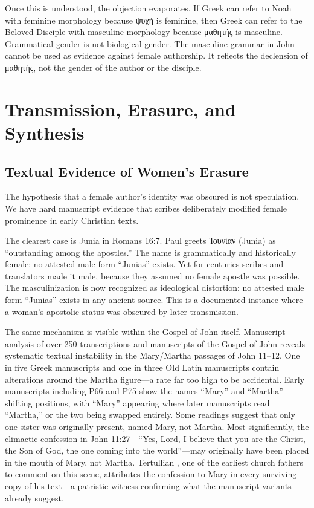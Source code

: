Once this is understood, the objection evaporates.
If Greek can refer to Noah with feminine morphology because ψυχή is feminine, then Greek can refer to the Beloved Disciple with masculine morphology because μαθητής is masculine.
Grammatical gender is not biological gender.
The masculine grammar in John cannot be used as evidence against female authorship.
It reflects the declension of μαθητής, not the gender of the author or the disciple.

\section{Transmission, Erasure, and Synthesis}\label{sec:transmission-erasure-synthesis}

\subsection{Textual Evidence of Women's Erasure}\label{subsec:textual-evidence-of-womens-erasure}

The hypothesis that a female author's identity was obscured is not speculation.
We have hard manuscript evidence that scribes deliberately modified female prominence in early Christian texts.

The clearest case is Junia in Romans 16:7.
Paul greets Ἰουνίαν (Junia) as ``outstanding among the apostles.''
The name is grammatically and historically female; no attested male form ``Junias'' exists.
Yet for centuries scribes and translators made it male, because they assumed no female apostle was possible.
The masculinization is now recognized as ideological distortion: no attested male form ``Junias'' exists in any ancient source.
This is a documented instance where a woman's apostolic status was obscured by later transmission.

The same mechanism is visible within the Gospel of John itself.
Manuscript analysis \cite{schrader:martha} of over 250 transcriptions and manuscripts of the Gospel of John reveals systematic textual instability in the Mary/Martha passages of John 11--12.
One in five Greek manuscripts and one in three Old Latin manuscripts contain alterations around the Martha figure---a rate far too high to be accidental.
Early manuscripts including P66 and P75 show the names ``Mary'' and ``Martha'' shifting positions, with ``Mary'' appearing where later manuscripts read ``Martha,'' or the two being swapped entirely.
Some readings suggest that only one sister was originally present, named Mary, not Martha.
Most significantly, the climactic confession in John 11:27---``Yes, Lord, I believe that you are the Christ, the Son of God, the one coming into the world''---may originally have been placed in the mouth of Mary, not Martha.
Tertullian \cite{tertullian:praxean}, one of the earliest church fathers to comment on this scene, attributes the confession to Mary in every surviving copy of his text---a patristic witness confirming what the manuscript variants already suggest.

